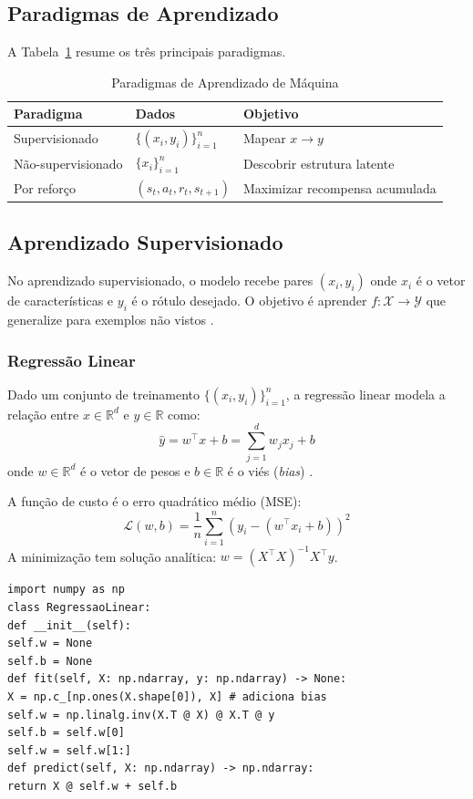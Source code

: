 \subsection{Paradigmas de Aprendizado}
A Tabela~\ref{tab:paradigmas-ml} resume os três principais paradigmas.
\begin{table}[htb]
\centering
\caption{Paradigmas de Aprendizado de Máquina}
\label{tab:paradigmas-ml}
\begin{tabular}{lll}
\toprule
\textbf{Paradigma} & \textbf{Dados} & \textbf{Objetivo} \\
\midrule
Supervisionado & $\{(x_i, y_i)\}_{i=1}^n$ & Mapear $x \to y$ \\
Não-supervisionado & $\{x_i\}_{i=1}^n$ & Descobrir estrutura latente \\
Por reforço & $(s_t, a_t, r_t, s_{t+1})$ & Maximizar recompensa acumulada \\
\bottomrule
\end{tabular}
\end{table}
\subsection{Aprendizado Supervisionado}
No aprendizado supervisionado, o modelo recebe pares
$(x_i, y_i)$ onde $x_i$ é o vetor de características e $y_i$ é o rótulo
desejado. O objetivo é aprender $f: \mathcal{X} \to \mathcal{Y}$ que
generalize para exemplos não vistos \cite{hastie2009elements}.
\subsubsection{Regressão Linear}
\begin{definicao}
Dado um conjunto de treinamento $\{(x_i, y_i)\}_{i=1}^n$, a regressão linear
modela a relação entre $x \in \mathbb{R}^d$ e $y \in \mathbb{R}$ como:
\[\hat{y} = w^\top x + b = \sum_{j=1}^d w_j x_j + b
\]
onde $w \in \mathbb{R}^d$ é o vetor de pesos e $b \in \mathbb{R}$ é o
viés (\textit{bias}) \cite{bishop2006pattern}.
\end{definicao}
A função de custo é o erro quadrático médio (MSE):
\[\mathcal{L}(w, b) = \frac{1}{n} \sum_{i=1}^n (y_i - (w^\top x_i + b))^2
\]
A minimização tem solução analítica: $w = (X^\top X)^{-1} X^\top y$.
\begin{lstlisting}[style=pythonstyle]
import numpy as np
class RegressaoLinear:
def __init__(self):
self.w = None
self.b = None
def fit(self, X: np.ndarray, y: np.ndarray) -> None:
X = np.c_[np.ones(X.shape[0]), X] # adiciona bias
self.w = np.linalg.inv(X.T @ X) @ X.T @ y
self.b = self.w[0]
self.w = self.w[1:]
def predict(self, X: np.ndarray) -> np.ndarray:
return X @ self.w + self.b
\end{lstlisting}
